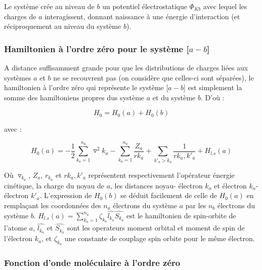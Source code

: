 Le système crée au niveau de $b$ un potentiel électrostatique $\Phi_{Kb}$ avec lequel les charges de $a$ interagissent, donnant naissance à une énergie d'interaction (et réciproquement au niveau du système $b$).

\subsubsection{Hamiltonien à l'ordre zéro pour le système [$a-b$]}

A distance suffisamment grande pour que les distributions de charges liées aux systèmes $a$ et $b$ ne se recouvrent pas (on considère que celles-ci sont séparées), le hamiltonien à l'ordre zéro qui représente le système [$a-b$] est simplement la somme des hamiltoniens propres dus système $a$ et du système $b$. D'où : 
	
\begin{equation}
H_{0} = H_{0}(a) + H_{0}(b) \label{1.2}
\end{equation}
	
avec : 
	
\begin{equation}
H_{0}(a) = -\frac{1}{2} \sum_{k_{a}=1}^{n_{a}} \triangledown^{2} k_{a} - \sum_{k_{a}=1}^{n_{a}} \frac{Z_{a}}{rk_{a}} + \sum_{k'_{a}>k_{a}} \frac{1}{rk_{a},k'_{a}} + H_{l.s}(a)  \label{1.3}
\end{equation}
		
Où $\triangledown_{k_{a}}$, $Z_{a}$, $r_{k_{a}}$ et $rk_{a},k'_{a}$ représentent respectivement l'opérateur énergie cinétique, la charge du noyau de $a$, les distances noyau- électron $k_{a}$ et électron $k_{a}$- électron $k'_{a}$. L'expression de $H_{0}(b)$ se déduit facilement de celle de $H_{0}(a)$ en remplaçant les coordonnées des $n_{a}$ électrons du système $a$ par les $n_{b}$ électrons du système $b$. $H_{l.s}(a)= \sum_{k_{a}=1}^{n_{a}} \zeta_{k_{a}} \widehat{l_{k_{a}}} \widehat{S_{k_{a}}}$ est le hamiltonien de spin-orbite de l'atome $a$, $\widehat{l_{k_{a}}}$ et $\widehat{S_{k_{a}}}$ sont les operateurs moment orbital et moment de spin de l'électron $k_{a}$, et $\zeta_{k_{a}}$ une constante de couplage spin orbite pour le même électron.


\subsubsection{Fonction d'onde moléculaire à l'ordre zéro}

